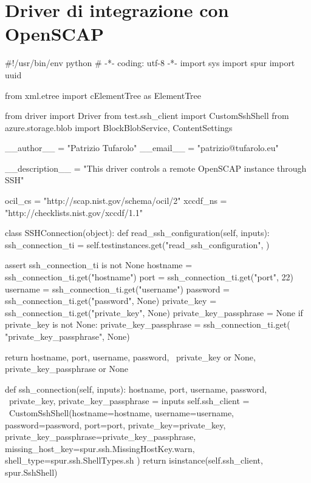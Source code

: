 \appendix
\thispagestyle{plain}


\chapter{Driver di integrazione con OpenSCAP}
\begin{python}
#!/usr/bin/env python
# -*- coding: utf-8 -*-
import sys
import spur
import uuid

from xml.etree import cElementTree as ElementTree

from driver import Driver
from test.ssh_client import CustomSshShell
from azure.storage.blob import BlockBlobService, ContentSettings

__author__ = "Patrizio Tufarolo"
__email__ = "patrizio@tufarolo.eu"

__description__ = "This driver controls a remote OpenSCAP instance through SSH"

ocil_cs = "http://scap.nist.gov/schema/ocil/2"
xccdf_ns = "http://checklists.nist.gov/xccdf/1.1"


class SSHConnection(object):
    def read_ssh_configuration(self, inputs):
        ssh_connection_ti = self.testinstances.get("read_ssh_configuration",
                                                   {})

        assert ssh_connection_ti is not None
        hostname = ssh_connection_ti.get("hostname")
        port = ssh_connection_ti.get("port", 22)
        username = ssh_connection_ti.get("username")
        password = ssh_connection_ti.get("password", None)
        private_key = ssh_connection_ti.get("private_key", None)
        private_key_passphrase = None
        if private_key is not None:
            private_key_passphrase = ssh_connection_ti.get(
                "private_key_passphrase",
                None)

        return hostname, port, username, password, \
            private_key or None, private_key_passphrase or None

    def ssh_connection(self, inputs):
        hostname, port, username, password, \
            private_key, private_key_passphrase = inputs
        self.ssh_client = \
            CustomSshShell(hostname=hostname,
                           username=username,
                           password=password,
                           port=port,
                           private_key=private_key,
                           private_key_passphrase=private_key_passphrase,
                           missing_host_key=spur.ssh.MissingHostKey.warn,
                           shell_type=spur.ssh.ShellTypes.sh
                           )
        return isinstance(self.ssh_client, spur.SshShell)


\end{python}
